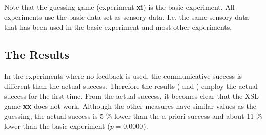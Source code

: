 Note that the guessing game (experiment {\bf xi}) is the basic experiment. All experiments use the basic data set as sensory data. I.e. the same sensory data that has been used in the basic experiment and most other experiments.

\subsection{The Results}


In the experiments where no feedback is used, the communicative success is different than the actual success. Therefore the results ( and ) employ the actual success for the first time. From the actual success, it becomes clear that the XSL game {\bf xx} does not work. Although the other measures have similar values as the guessing, the actual success is 5 \% lower than the a priori success and about 11 \% lower than the basic experiment ($p=0.0000$).

